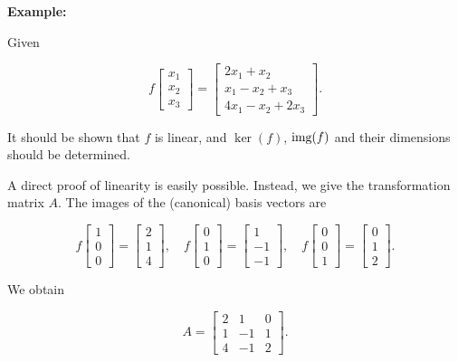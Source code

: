 \textbf{Example:}

Given

\[
    f\begin{bmatrix}
    x_1 \\
    x_2 \\
    x_3
    \end{bmatrix} =
    \begin{bmatrix}
    2x_1 + x_2 \\
    x_1 - x_2 + x_3 \\
    4x_1 - x_2 + 2x_3
    \end{bmatrix} .
\]

It should be shown that \(f\) is linear, and \(\ker(f)\), \(\text{img}(f)\) and their dimensions should be determined.

A direct proof of linearity is easily possible. Instead, we give the transformation matrix \(A\). The images of the (canonical) basis vectors are

\[
    f\begin{bmatrix}
    1 \\
    0 \\
    0
    \end{bmatrix} =
    \begin{bmatrix}
    2 \\
    1 \\
    4
    \end{bmatrix} , \quad
    f\begin{bmatrix}
    0 \\
    1 \\
    0
    \end{bmatrix} =
    \begin{bmatrix}
    1 \\
    -1 \\
    -1
    \end{bmatrix} , \quad
    f\begin{bmatrix}
    0 \\
    0 \\
    1
    \end{bmatrix} =
    \begin{bmatrix}
    0 \\
    1 \\
    2
    \end{bmatrix} .
\]

We obtain

\[
    A =
    \begin{bmatrix}
    2 & 1 & 0 \\
    1 & -1 & 1 \\
    4 & -1 & 2
    \end{bmatrix} .
\]

